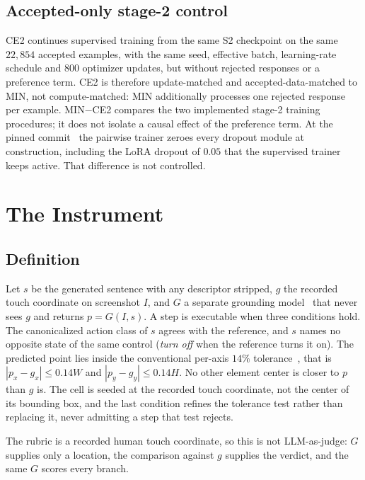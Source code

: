 \documentclass[conference]{IEEEtran}
\begin{document}
\subsection{Accepted-only stage-2 control}

CE2 continues supervised training from the same S2 checkpoint on the same $22{,}854$ accepted
examples, with the same seed, effective batch, learning-rate schedule and $800$ optimizer
updates, but without rejected responses or a preference term. CE2 is therefore
update-matched and accepted-data-matched to MIN, not compute-matched: MIN additionally
processes one rejected response per example. MIN$-$CE2 compares the two implemented stage-2
training procedures; it does not isolate a causal effect of the preference term. At the
pinned commit~\cite{llamafactory} the pairwise trainer zeroes every dropout module at
construction, including the LoRA dropout of $0.05$ that the supervised trainer keeps active.
That difference is not controlled.

\section{The Instrument}
\label{sec:metric}

\subsection{Definition}
Let $s$ be the generated sentence with any descriptor stripped, $g$ the recorded touch coordinate
on screenshot $I$, and $G$ a separate grounding model~\cite{uground} that never sees $g$ and
returns $p = G(I,s)$. A step is executable when three conditions hold. The canonicalized action class of $s$ agrees
with the reference, and $s$ names no opposite state of the same control (\emph{turn off} when
the reference turns it on). The predicted point lies inside the conventional per-axis $14\%$
tolerance~\cite{aitw}, that is $|p_x - g_x| \le 0.14W$ and $|p_y - g_y| \le 0.14H$. No other
element center is closer to $p$ than $g$ is. The cell is seeded at the recorded touch
coordinate, not the center of its bounding box, and the last condition refines the tolerance
test rather than replacing it, never admitting a step that test rejects.

The rubric is a recorded human touch coordinate, so this is not LLM-as-judge: $G$ supplies only a location, the comparison against $g$ supplies the verdict, and the same $G$ scores every branch.
\end{document}
